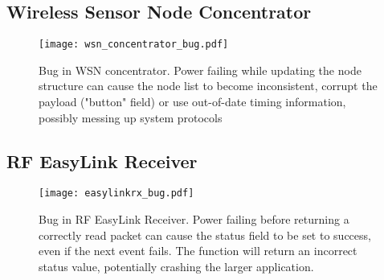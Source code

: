 \subsection{Wireless Sensor Node Concentrator}
\begin{figure}[h]
\centering
\texttt{[image: wsn\_concentrator\_bug.pdf]}
\caption{Bug in WSN concentrator. Power failing while updating the node structure can cause the node list to become inconsistent, corrupt the payload ("button" field) or use out-of-date timing information, possibly messing up system protocols}
\label{fig:wsn}
\end{figure}

\subsection{RF EasyLink Receiver}
\begin{figure}[h]
\centering
\texttt{[image: easylinkrx\_bug.pdf]}
\caption{Bug in RF EasyLink Receiver. Power failing before returning a correctly read packet can cause the status field to be set to success, even if the next event fails. The function will return an incorrect status value, potentially crashing the larger application.}
\label{fig:rf}
\end{figure}